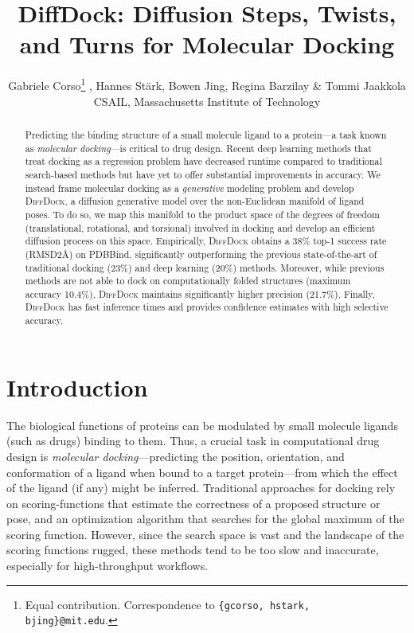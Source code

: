 \documentclass{article} \usepackage{iclr2023_conference,times}
\title{DiffDock: Diffusion Steps, Twists, \\ and Turns for Molecular Docking}
\author{Gabriele Corso\thanks{Equal contribution. Correspondence to \texttt{\{gcorso, hstark, bjing\}@mit.edu}.} ,  Hannes St\"ark,  Bowen Jing,  Regina Barzilay \& Tommi Jaakkola  \\
CSAIL, Massachusetts Institute of Technology \\
}
\begin{document}
\maketitle

\begin{abstract}

Predicting the binding structure of a small molecule ligand to a protein---a task known as \emph{molecular docking}---is critical to drug design. Recent deep learning methods that treat docking as a regression problem have decreased runtime compared to traditional search-based methods but have yet to offer substantial improvements in accuracy. We instead frame molecular docking as a \emph{generative} modeling problem and develop \textsc{DiffDock}, a diffusion generative model over the non-Euclidean manifold of ligand poses. To do so, we map this manifold to the product space of the degrees of freedom (translational, rotational, and torsional) involved in docking and develop an efficient diffusion process on this space. Empirically, \textsc{DiffDock} obtains a 38\% top-1 success rate (RMSD2\AA) on PDBBind, significantly outperforming the previous state-of-the-art of traditional docking (23\%) and deep learning (20\%) methods. Moreover, while previous methods are not able to dock on computationally folded structures (maximum accuracy 10.4\%), \textsc{DiffDock} maintains significantly higher precision (21.7\%). Finally, \textsc{DiffDock} has fast inference times and provides confidence estimates with high selective accuracy. 
\end{abstract}





\section{Introduction}

The biological functions of proteins can be modulated by small molecule ligands (such as drugs) binding to them. Thus, a crucial task in computational drug design is \emph{molecular docking}---predicting the position, orientation, and conformation of a ligand when bound to a target protein---from which the effect of the ligand (if any) might be inferred. Traditional approaches for docking \citep{trott2010autodock,halgren2004glide} rely on scoring-functions that estimate the correctness of a proposed structure or pose, and an optimization algorithm that searches for the global maximum of the scoring function. However, since the search space is vast and the landscape of the scoring functions rugged, these methods tend to be too slow and inaccurate, especially for high-throughput workflows.
\end{document}
